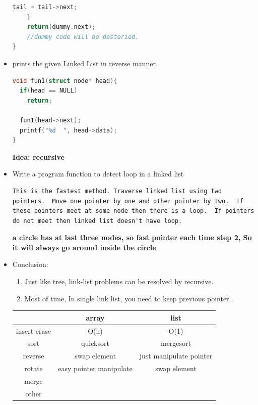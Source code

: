 \documentclass[a4paper,11pt,twoside]{book}
\begin{document}
\begin{itemize}
\begin{lstlisting}[frame=single, language=c++]
        tail = tail->next;
    }
    return(dummy.next);
    //dummy code will be destoried. 
}
 \end{lstlisting}


	\item prints the given Linked List in reverse manner. 
\begin{lstlisting}[frame=single, language=c++]
void fun1(struct node* head){
  if(head == NULL)
    return;
  
  fun1(head->next);
  printf("%d  ", head->data);
}
\end{lstlisting}
\textbf{Idea: recursive}


	\item Write a program function to detect loop in a linked list
\begin{lstlisting}[breaklines]
This is the fastest method. Traverse linked list using two pointers.  Move one pointer by one and other pointer by two.  If these pointers meet at some node then there is a loop.  If pointers do not meet then linked list doesn't have loop.
\end{lstlisting}
\textbf{a circle has at last three nodes, so fast pointer each time step 2, So it will always go around inside the circle}

	\item Conclusion:
\begin{enumerate}
\item Just like tree, link-list problems can be resolved by recursive. 
\item Most of time, In single link list, you need to keep previous pointer. 
\end{enumerate}

\begin{tabular}{|c|c|c|}
\hline 
 & array & list \\ 
\hline 
insert erase & O(n) & O(1) \\ 
\hline 
sort & quicksort & mergesort  \\ 
\hline 
reverse & swap element & just manipulate pointer  \\ 
\hline 
rotate & easy pointer manipulate & swap element  \\ 
\hline 
merge &  &  \\ 
\hline 
other  &  &  \\ 
\hline 

\end{tabular} 


\end{itemize}
\end{document}
